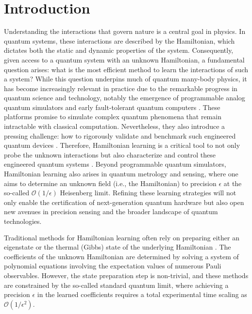 \documentclass[twocolumn,superscriptaddress,aps,showpacs,amsmath,amstex,amssymb,citeautoscript,floatfix,pra,preprintnumbers]{revtex4-2}
\theoremstyle{plain}
\theoremstyle{plain}
\theoremstyle{plain}
\theoremstyle{plain}
\theoremstyle{plain}
\theoremstyle{plain}
\begin{document}
\section{Introduction}
Understanding the interactions that govern nature is a central goal in physics. In quantum systems, these interactions are described by the Hamiltonian, which dictates both the static and dynamic properties of the system. Consequently, given access to a quantum system with an unknown Hamiltonian, a fundamental question arises: what is the most efficient method to learn the interactions of such a system? While this question underpins much of quantum many-body physics, it has become increasingly relevant in practice due to the remarkable progress in quantum science and technology, notably the emergence of programmable analog quantum simulators \cite{Daley23,ProbingQuantumDynamics,SpinLiquid} and early fault-tolerant quantum computers \cite{PhysRevX.11.041058,demo_FTgates,LogicalRydberg,GoogleBreakEven,AlgorithmicFT}. These platforms promise to simulate complex quantum phenomena that remain intractable with classical computation. Nevertheless, they also introduce a pressing challenge: how to rigorously validate and benchmark such engineered quantum devices \cite{QuantumVerification}. Therefore, Hamiltonian learning is a critical tool to not only probe the unknown interactions but also characterize and control these engineered quantum systems \cite{RobustLearningSuperConducting,HuangTongFangSu2023learning,ma2024learningkbodyhamiltonianscompressed,LiTongNiGefenYing2023heisenberg,QLFH,Bakshi_2024,PhysRevA.110.062421,RobustEstimation,Yu2023robustefficient,SampleEfficientLearning,EntanglementHamiltonianLearning,Olsacher_2025,2024arXiv240101308O,PauliTransfer,MobusBluhmCaroEtAl2023dissipation}.  Beyond programmable quantum simulators, Hamiltonian learning also arises in quantum metrology and sensing, where one aims to determine an unknown field (i.e., the Hamiltonian) to precision $\epsilon$ at the so-called $\mathcal{O}(1/\epsilon)$ Heisenberg limit. Refining these learning strategies will not only enable the certification of next-generation quantum hardware but also open new avenues in precision sensing and the broader landscape of quantum technologies.



Traditional methods for Hamiltonian learning often rely on preparing either an eigenstate or the thermal (Gibbs) state of the underlying Hamiltonian \cite{HighTempGibbs,2023arXiv231002243B,PracticalGibbsLearning,Qi2019determininglocal,PhysRevLett.124.160502,BayesianHamiltonianLearning}. The coefficients of the unknown Hamiltonian are determined by solving a system of polynomial equations involving the expectation values of numerous Pauli observables. However, the state preparation step is non-trivial, and these methods are constrained by the so-called standard quantum limit, where achieving a precision $\epsilon$ in the learned coefficients requires a total experimental time scaling as $\mathcal{O}(1/\epsilon^2)$.
\end{document}
